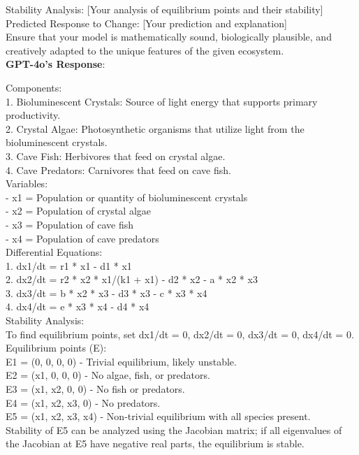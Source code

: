 \begin{tcolorbox}[breakable,boxrule=0.5pt,sharp corners,fontupper=\small,
colback=green!10, colframe=green!50!black, title={Success: Mathematical Model of Subterranean Crystal Caves}]
Stability Analysis: [Your analysis of equilibrium points and their stability]\\

Predicted Response to Change: [Your prediction and explanation]\\

Ensure that your model is mathematically sound, biologically plausible, and creatively adapted to the unique features of the given ecosystem.\\

\textbf{GPT-4o's Response}:

Components:\\
1. Bioluminescent Crystals: Source of light energy that supports primary productivity.\\
2. Crystal Algae: Photosynthetic organisms that utilize light from the bioluminescent crystals.\\
3. Cave Fish: Herbivores that feed on crystal algae.\\
4. Cave Predators: Carnivores that feed on cave fish.\\

Variables:\\
- x1 = Population or quantity of bioluminescent crystals\\
- x2 = Population of crystal algae\\
- x3 = Population of cave fish\\
- x4 = Population of cave predators\\

Differential Equations:\\
1. dx1/dt = r1 * x1 - d1 * x1\\
2. dx2/dt = r2 * x2 * x1/(k1 + x1) - d2 * x2 - a * x2 * x3\\
3. dx3/dt = b * x2 * x3 - d3 * x3 - c * x3 * x4\\
4. dx4/dt = e * x3 * x4 - d4 * x4\\

Stability Analysis:\\
To find equilibrium points, set dx1/dt = 0, dx2/dt = 0, dx3/dt = 0, dx4/dt = 0.\\
Equilibrium points (E):\\
E1 = (0, 0, 0, 0) - Trivial equilibrium, likely unstable.\\
E2 = (x1\*, 0, 0, 0) - No algae, fish, or predators.\\
E3 = (x1\*, x2\*, 0, 0) - No fish or predators.\\
E4 = (x1\*, x2\*, x3\*, 0) - No predators.\\
E5 = (x1\*, x2\*, x3\*, x4\*) - Non-trivial equilibrium with all species present.\\
Stability of E5 can be analyzed using the Jacobian matrix; if all eigenvalues of the Jacobian at E5 have negative real parts, the equilibrium is stable.\\


\end{tcolorbox}
